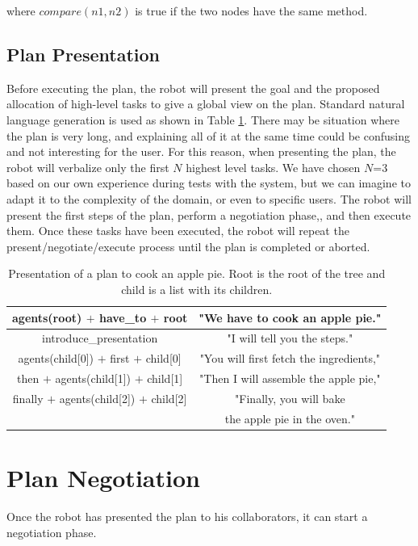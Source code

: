 where $compare(n1,n2)$ is true if the two nodes have the same method.

\subsection{Plan Presentation}
Before executing the plan, the robot will present the goal and the proposed allocation of high-level tasks to give a global view on the plan. Standard natural language generation is used as shown in Table \ref{table:plan_management-pie-present}. 
There may be situation where the plan is very long, and explaining all of it at the same time could be confusing and not interesting for the user. For this reason, when presenting the plan, the robot will verbalize only the first $N$  highest level tasks. We have chosen $N$=$3$ based on our own experience during tests with the system, but we can imagine to adapt it to the complexity of the domain, or even to specific users. The robot will present the first steps of the plan, perform a negotiation phase,, and then execute them. Once these tasks have been executed, the robot will repeat the present/negotiate/execute process until the plan is completed or aborted.
 
 \begin{table}
\centering
\scriptsize
\renewcommand{\arraystretch}{1.3}
\begin{tabular}{c|c}
   agents(root) $+$ have\_to $+$ root  & "We have to cook an apple pie." \\
   \hline
   introduce\_presentation & "I will tell you the steps." \\
   \hline
   agents(child[0]) $+$ first $+$ child[0] & "You will first fetch the ingredients," \\
   \hline
   then $+$ agents(child[1]) $+$  child[1] & "Then I will assemble the apple pie," \\
   \hline
   finally $+$ agents(child[2]) $+$  child[2] & "Finally, you will bake \\
   & the apple pie in the oven." \\
\end{tabular}
\caption{Presentation of a plan to cook an apple pie. Root is the root of the tree and child is a list with its children.}
 \label{table:plan_management-pie-present}    
\end{table}

\section{Plan Negotiation}
\label{plan_managemet-plan_negotiation}
Once the robot has presented the plan to his collaborators, it can start a negotiation phase. 

